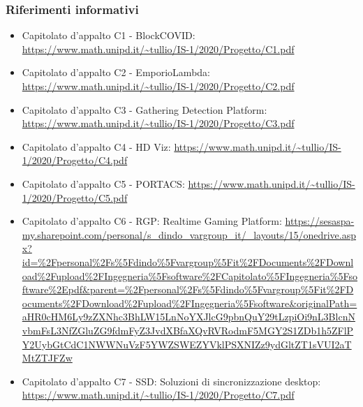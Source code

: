 \subsubsection{Riferimenti informativi}
\begin{itemize}
\item Capitolato d'appalto C1 - BlockCOVID:\newline
\url{https://www.math.unipd.it/~tullio/IS-1/2020/Progetto/C1.pdf}
\item Capitolato d'appalto C2 - EmporioLambda:\newline
\url{https://www.math.unipd.it/~tullio/IS-1/2020/Progetto/C2.pdf}
\item Capitolato d'appalto C3 - Gathering Detection Platform:\newline
\url{https://www.math.unipd.it/~tullio/IS-1/2020/Progetto/C3.pdf}
\item Capitolato d'appalto C4 - HD Viz:\newline
\url{https://www.math.unipd.it/~tullio/IS-1/2020/Progetto/C4.pdf}
\item Capitolato d'appalto C5 - PORTACS:\newline
\url{https://www.math.unipd.it/~tullio/IS-1/2020/Progetto/C5.pdf}
\item Capitolato d'appalto C6 - RGP: Realtime Gaming Platform:\newline
\url{https://sesaspa-my.sharepoint.com/personal/s_dindo_vargroup_it/_layouts/15/onedrive.aspx?id=%2Fpersonal%2Fs%5Fdindo%5Fvargroup%5Fit%2FDocuments%2FDownload%2Fupload%2FIngegneria%5Fsoftware%2FCapitolato%5FIngegneria%5Fsoftware%2Epdf&parent=%2Fpersonal%2Fs%5Fdindo%5Fvargroup%5Fit%2FDocuments%2FDownload%2Fupload%2FIngegneria%5Fsoftware&originalPath=aHR0cHM6Ly9zZXNhc3BhLW15LnNoYXJlcG9pbnQuY29tLzpiOi9nL3BlcnNvbmFsL3NfZGluZG9fdmFyZ3JvdXBfaXQvRVRodmF5MGY2S1ZDb1h5ZFlPY2UybGtCdC1NWWNuVzF5YWZSWEZYVklPSXNIZz9ydGltZT1sVUI2aTMtZTJFZw}
\item Capitolato d'appalto C7 - SSD: Soluzioni di sincronizzazione desktop:\newline
\url{https://www.math.unipd.it/~tullio/IS-1/2020/Progetto/C7.pdf}
\end{itemize}
